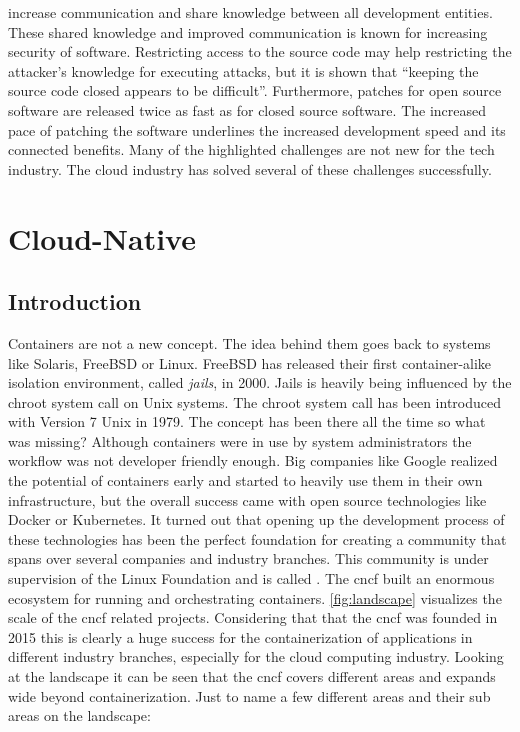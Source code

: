 \documentclass[titlepage]{report}
\begin{document}
increase communication and share knowledge between all development entities. These shared knowledge and improved communication is known for increasing
security of software\cite{hoepman2007increased}. Restricting access to the source code may help restricting the attacker's knowledge for executing attacks, but it is shown that
``keeping the source code closed appears to be difficult''\cite{mercuri2003security}. Furthermore, patches for open source software are released twice as fast
as for closed source software\cite{witten2001does}. The increased pace of patching the software underlines the increased development speed and its connected
benefits. Many of the highlighted challenges are not new for the tech industry. The cloud industry has solved several of these challenges successfully.

\chapter{Cloud-Native}\label{chapter:cloud_native}
\section{Introduction}
Containers are not a new concept. The idea behind them goes back to systems like Solaris, FreeBSD or Linux. FreeBSD has released their first container-alike
isolation environment, called \emph{jails}, in 2000\cite{FreeBSD4Announcement}. Jails is heavily being influenced by the chroot system call on Unix systems.
The chroot system call has been introduced with Version 7 Unix in 1979\cite{BYTE}. The concept has been there all the time so what was missing?
Although containers were in use by system administrators the workflow was not developer friendly enough. Big companies like Google
realized the potential of containers early and started to heavily use them in their own infrastructure, but the overall success
came with open source technologies like Docker or Kubernetes. It turned out that opening up the development process of these technologies
has been the perfect foundation for creating a community that spans over several companies and industry branches. This community is under
supervision of the Linux Foundation and is called \cite{CNCFFounding}. The \gls{cncf} built an enormous ecosystem for
running and orchestrating containers. \autoref{fig:landscape} visualizes the scale of the \gls{cncf} related projects\cite{CNCFLandscape}. Considering that
that the \gls{cncf} was founded in 2015 this is clearly a huge success for the containerization of applications in different industry branches, especially
for the cloud computing industry. Looking at the landscape it can be seen that the \gls{cncf} covers different areas and expands wide beyond containerization.
Just to name a few different areas and their sub areas on the landscape:
\end{document}
